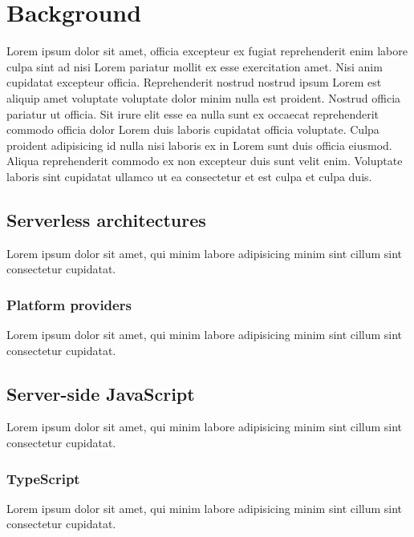 \chapter{Background}
\label{chap:background}

Lorem ipsum dolor sit amet, officia excepteur ex fugiat reprehenderit enim labore culpa sint ad nisi Lorem pariatur mollit ex esse exercitation amet. Nisi anim cupidatat excepteur officia. Reprehenderit nostrud nostrud ipsum Lorem est aliquip amet voluptate voluptate dolor minim nulla est proident. Nostrud officia pariatur ut officia. Sit irure elit esse ea nulla sunt ex occaecat reprehenderit commodo officia dolor Lorem duis laboris cupidatat officia voluptate. Culpa proident adipisicing id nulla nisi laboris ex in Lorem sunt duis officia eiusmod. Aliqua reprehenderit commodo ex non excepteur duis sunt velit enim. Voluptate laboris sint cupidatat ullamco ut ea consectetur et est culpa et culpa duis.

\section{Serverless architectures}

Lorem ipsum dolor sit amet, qui minim labore adipisicing minim sint cillum sint consectetur cupidatat.

\subsection{Platform providers}

Lorem ipsum dolor sit amet, qui minim labore adipisicing minim sint cillum sint consectetur cupidatat.

\section{Server-side JavaScript}

Lorem ipsum dolor sit amet, qui minim labore adipisicing minim sint cillum sint consectetur cupidatat.

\subsection{TypeScript}

Lorem ipsum dolor sit amet, qui minim labore adipisicing minim sint cillum sint consectetur cupidatat.
